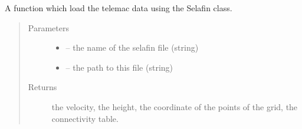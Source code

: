\documentclass[letterpaper,10pt,english]{sphinxmanual}
\begin{document}
\begin{fulllineitems}
\label{\detokenize{index:src.selafin_habby1.load_telemac}}
A function which load the telemac data using the Selafin class.
\begin{quote}\begin{description}
\item[{Parameters}] \leavevmode\begin{itemize}
\item {} 
 -- the name of the selafin file (string)

\item {} 
 -- the path to this file (string)

\end{itemize}

\item[{Returns}] \leavevmode
the velocity, the height, the coordinate of the points of the grid, the connectivity table.

\end{description}\end{quote}

\end{fulllineitems}

\end{document}
